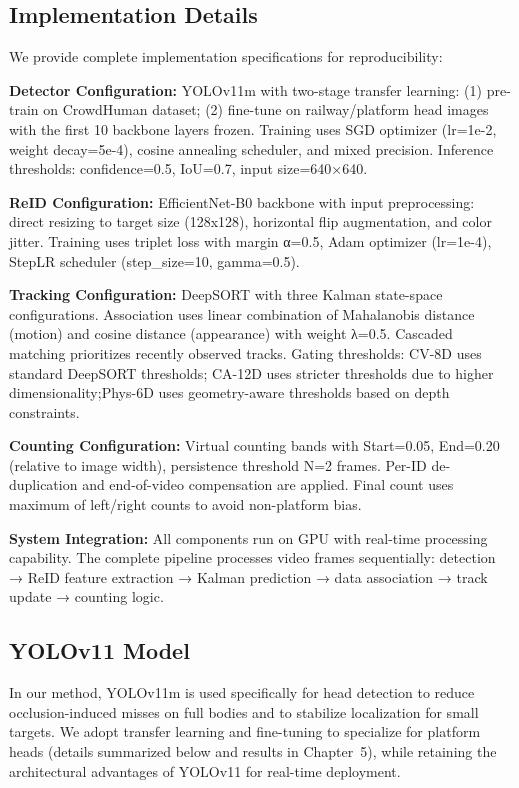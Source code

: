 \subsection{Implementation Details}
We provide complete implementation specifications for reproducibility:

\textbf{Detector Configuration:} YOLOv11m with two-stage transfer learning: (1) pre-train on CrowdHuman dataset; (2) fine-tune on railway/platform head images with the first 10 backbone layers frozen. Training uses SGD optimizer (lr=1e-2, weight decay=5e-4), cosine annealing scheduler, and mixed precision. Inference thresholds: confidence=0.5, IoU=0.7, input size=640×640.

\textbf{ReID Configuration:} EfficientNet-B0 backbone with input preprocessing: direct resizing to target size (128x128), horizontal flip augmentation, and color jitter. Training uses triplet loss with margin α=0.5, Adam optimizer (lr=1e-4), StepLR scheduler (step\_size=10, gamma=0.5).

\textbf{Tracking Configuration:} DeepSORT with three Kalman state-space configurations. Association uses linear combination of Mahalanobis distance (motion) and cosine distance (appearance) with weight λ=0.5. Cascaded matching prioritizes recently observed tracks. Gating thresholds: CV-8D uses standard DeepSORT thresholds; CA-12D uses stricter thresholds due to higher dimensionality;Phys-6D uses geometry-aware thresholds based on depth constraints.

\textbf{Counting Configuration:} Virtual counting bands with Start=0.05, End=0.20 (relative to image width), persistence threshold N=2 frames. Per-ID de-duplication and end-of-video compensation are applied. Final count uses maximum of left/right counts to avoid non-platform bias.

\textbf{System Integration:} All components run on GPU with real-time processing capability. The complete pipeline processes video frames sequentially: detection → ReID feature extraction → Kalman prediction → data association → track update → counting logic.

\subsection{YOLOv11 Model}

In our method, YOLOv11m is used specifically for head detection to reduce occlusion-induced misses on full bodies and to stabilize localization for small targets. We adopt transfer learning and fine-tuning to specialize for platform heads (details summarized below and results in Chapter~5), while retaining the architectural advantages of YOLOv11 for real-time deployment.

